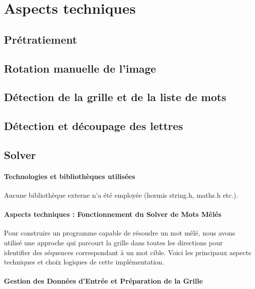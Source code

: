 \section{Aspects techniques}

\subsection{Prétratiement}
\subsection{Rotation manuelle de l'image}
\subsection{Détection de la grille et de la liste de mots}
\subsection{Détection et découpage des lettres}
\subsection{Solver}

\paragraph{Technologies et bibliothèques utilisées}
Aucune bibliothèque externe n’a été employée (hormis string.h, maths.h etc.).

\paragraph{Aspects techniques : Fonctionnement du Solver de Mots Mêlés}

Pour construire un programme capable de résoudre un mot mêlé, nous avons utilisé une approche qui parcourt la grille dans toutes les directions pour identifier des séquences correspondant à un mot cible. Voici les principaux aspects techniques et choix logiques de cette implémentation.

\paragraph{Gestion des Données d'Entrée et Préparation de la Grille}

